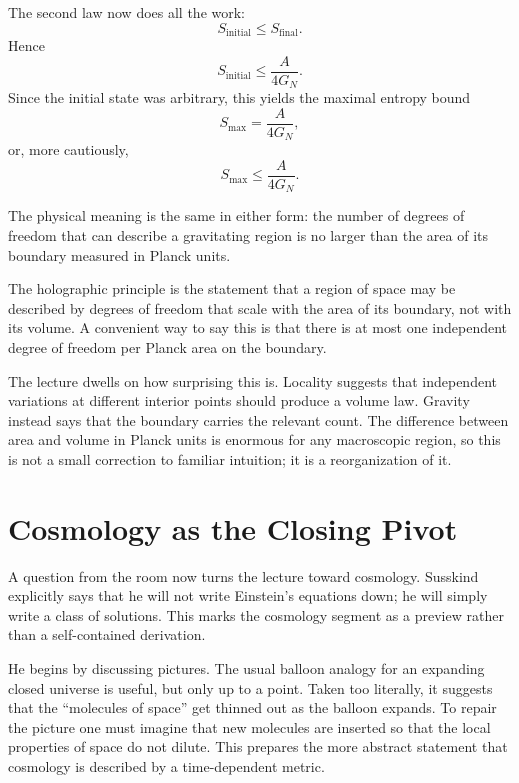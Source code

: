 The second law now does all the work:
\begin{equation}
S_{\mathrm{initial}} \le S_{\mathrm{final}}.
\end{equation}
Hence
\begin{equation}
S_{\mathrm{initial}} \le \frac{A}{4G_N}.
\end{equation}
Since the initial state was arbitrary, this yields the maximal entropy bound
\begin{equation}
S_{\max}=\frac{A}{4G_N},
\end{equation}
or, more cautiously,
\begin{equation}
S_{\max}\le \frac{A}{4G_N}.
\end{equation}

The physical meaning is the same in either form: the number of degrees of freedom that can describe a gravitating region is no larger than the area of its boundary measured in Planck units.

\begin{definition}
The holographic principle is the statement that a region of space may be described by degrees of freedom that scale with the area of its boundary, not with its volume. A convenient way to say this is that there is at most one independent degree of freedom per Planck area on the boundary.
\end{definition}

The lecture dwells on how surprising this is. Locality suggests that independent variations at different interior points should produce a volume law. Gravity instead says that the boundary carries the relevant count. The difference between area and volume in Planck units is enormous for any macroscopic region, so this is not a small correction to familiar intuition; it is a reorganization of it.

\section{Cosmology as the Closing Pivot}

A question from the room now turns the lecture toward cosmology. Susskind explicitly says that he will not write Einstein's equations down; he will simply write a class of solutions. This marks the cosmology segment as a preview rather than a self-contained derivation.

He begins by discussing pictures. The usual balloon analogy for an expanding closed universe is useful, but only up to a point. Taken too literally, it suggests that the ``molecules of space'' get thinned out as the balloon expands. To repair the picture one must imagine that new molecules are inserted so that the local properties of space do not dilute. This prepares the more abstract statement that cosmology is described by a time-dependent metric.

